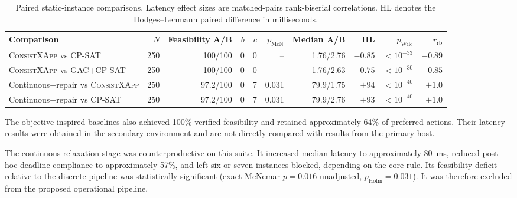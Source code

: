 \documentclass[pdflatex,sn-mathphys-num,iicol,oneside]{sn-jnl}
\newcommand{\method}{\textsc{ConsistXApp}\xspace}
\newcommand{\gac}{\textsc{GAC}\xspace}
\newcommand{\cpsat}{\textsc{CP-SAT}\xspace}
\begin{document}
\begin{table}[t]
\centering
\caption{
Paired static-instance comparisons. Latency effect sizes are
matched-pairs rank-biserial correlations. HL denotes the
Hodges--Lehmann paired difference in milliseconds.
}
\label{tab:stats-paired}
\setlength{\tabcolsep}{3pt}
\small

\begin{tabular}{lrrrrrrrrr}
\toprule
Comparison &
$N$ &
Feasibility A/B &
$b$ & $c$ &
$p_{\mathrm{McN}}$ &
Median A/B &
HL &
$p_{\mathrm{Wilc}}$ &
$r_{\mathrm{rb}}$\\
\midrule

\method vs \cpsat
& 250 & 100/100 & 0 & 0 & -- & 1.76/2.76 &
$-0.85$ & $<10^{-33}$ & $-0.89$\\

\method vs \gac+\cpsat
& 250 & 100/100 & 0 & 0 & -- & 1.76/2.63 &
$-0.75$ & $<10^{-30}$ & $-0.85$\\

Continuous+repair vs \method
& 250 & 97.2/100 & 0 & 7 & 0.031 & 79.9/1.75 &
$+94$ & $<10^{-40}$ & $+1.0$\\

Continuous+repair vs \cpsat
& 250 & 97.2/100 & 0 & 7 & 0.031 & 79.9/2.76 &
$+93$ & $<10^{-40}$ & $+1.0$\\

\bottomrule
\end{tabular}
\normalsize
\end{table}

The objective-inspired baselines also achieved 100\% verified
feasibility and retained approximately 64\% of preferred actions.
Their latency results were obtained in the secondary environment and
are not directly compared with results from the primary host.

The continuous-relaxation stage was counterproductive on this suite.
It increased median latency to approximately 80~ms, reduced post-hoc
deadline compliance to approximately 57\%, and left six or seven
instances blocked, depending on the core rule. Its feasibility deficit relative to the discrete pipeline was statistically significant (exact McNemar $p=0.016$ unadjusted, $p_{\mathrm{Holm}}=0.031$). It was therefore
excluded from the proposed operational pipeline.
\end{document}
